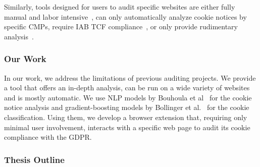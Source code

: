 Similarly, tools designed for users to audit specific websites are either fully manual and labor intensive~\cite{gorin2024edpb}, can only automatically analyze cookie notices by specific CMPs, require IAB TCF compliance~\cite{matte2020cookiebannersrespectchoice}, or only provide rudimentary analysis~\cite{cookie_information2019cookie}.

\subsubsection{Our Work}
In our work, we address the limitations of previous auditing projects.
We provide a tool that offers an in-depth analysis, can be run on a wide variety of websites and is mostly automatic.
We use NLP models by Bouhoula et al~\cite{bouhoula2023automated} for the cookie notice analysis and gradient-boosting models by Bollinger et al.~\cite{bollinger2022automating} for the cookie classification.
Using them, we develop a browser extension that, requiring only minimal user involvement, interacts with a specific web page to audit its cookie compliance with the GDPR.

\subsubsection{Thesis Outline}